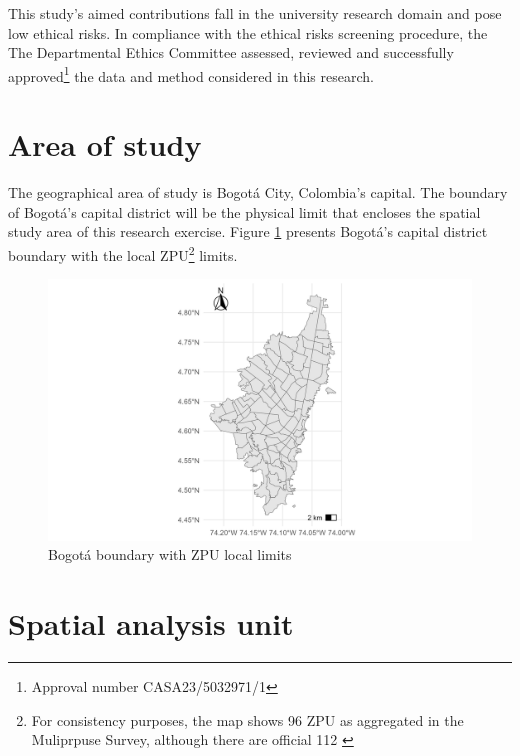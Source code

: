 \documentclass[12pt, a4paper]{report}
\begin{document}
This study's aimed contributions fall in the university research domain and pose low ethical risks. In compliance with the ethical risks screening procedure, the
The Departmental Ethics Committee assessed, reviewed and successfully approved\footnote{Approval number CASA23/5032971/1} the data and method considered in this research. 


\section{Area of study}

The geographical area of study is Bogotá City, Colombia's capital. The boundary of Bogotá's capital district will be the physical limit that encloses the spatial study area of this research exercise. Figure \ref{fig:Study_Area_ZPU} presents Bogotá's capital district boundary with the local ZPU\footnote{For consistency purposes, the map shows 96 ZPU as aggregated in the Muliprpuse Survey, although there are official 112 \citep{secretariadistritaldegobiernoCaracterizacionUsuarios20212021}} limits.

\begin{figure}[H]
    \centering
    \includegraphics[width=16cm]{Data/Results/Images/Study_Area_UPZ.png}
    \caption{Bogotá boundary with ZPU local limits \citep{ secretariadistritaldeplaneacionCapaGeograficaEncuesta2023}}
    \label{fig:Study_Area_ZPU}
\end{figure}


\section{Spatial analysis unit}
\end{document}
